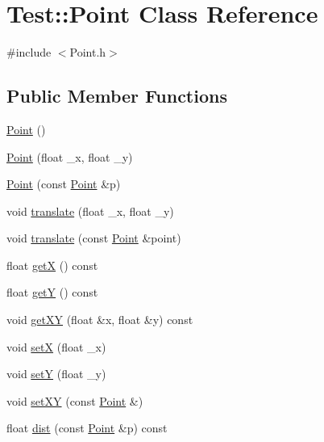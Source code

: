 \hypertarget{class_test_1_1_point}{\section{Test\+:\+:Point Class Reference}
\label{class_test_1_1_point}
}


{\ttfamily \#include $<$Point.\+h$>$}

\subsection*{Public Member Functions}
\begin{DoxyCompactItemize}
\item 
\hyperlink{class_test_1_1_point_a75262b362dd2b74e43d8507b25df2ae1}{Point} ()
\item 
\hyperlink{class_test_1_1_point_a2e046408db72b25b8930a37b43945d8f}{Point} (float \+\_\+x, float \+\_\+y)
\item 
\hyperlink{class_test_1_1_point_ad995a63eb5de6fb55c6f97c91a215b72}{Point} (const \hyperlink{class_test_1_1_point}{Point} \&p)
\item 
void \hyperlink{class_test_1_1_point_af814804da51d88db7ba5f74be5b37163}{translate} (float \+\_\+x, float \+\_\+y)
\item 
void \hyperlink{class_test_1_1_point_abbd9896489fc199bfeedb46b5228e18c}{translate} (const \hyperlink{class_test_1_1_point}{Point} \&point)
\item 
float \hyperlink{class_test_1_1_point_a7550e87a43c6f537c2d7e778d2a52559}{get\+X} () const 
\item 
float \hyperlink{class_test_1_1_point_aee11dd0d2b927293c6311fbc2d13c482}{get\+Y} () const 
\item 
void \hyperlink{class_test_1_1_point_a7bc2523abb4a65c4b1e664c8bbd80cc6}{get\+X\+Y} (float \&x, float \&y) const 
\item 
void \hyperlink{class_test_1_1_point_a269df23943b4b32772c8c5a6832c4ec0}{set\+X} (float \+\_\+x)
\item 
void \hyperlink{class_test_1_1_point_a28e7c86240aeffdec9ab8eb8fa6d1e4b}{set\+Y} (float \+\_\+y)
\item 
void \hyperlink{class_test_1_1_point_a85a63d8e69d8e85b15b6ad0e8a47d9a3}{set\+X\+Y} (const \hyperlink{class_test_1_1_point}{Point} \&)
\item 
float \hyperlink{class_test_1_1_point_a7de88947935a81c9497f29a3634fa6fc}{dist} (const \hyperlink{class_test_1_1_point}{Point} \&p) const 
\item 

\end{DoxyCompactItemize}
